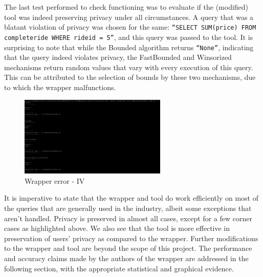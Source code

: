 \documentclass[acmsmall]{acmart}
\begin{document}
The last test performed to check functioning was to evaluate if the (modified) tool was indeed preserving privacy under all circumstances. A query that was a blatant violation of privacy was chosen for the same: \texttt{“SELECT SUM(price) FROM completeride WHERE ride\textunderscore id = 5”}, and this query was passed to the tool. It is surprising to note that while the Bounded algorithm returns \texttt{“None”}, indicating that the query indeed violates privacy, the FastBounded and Winsorized mechanisms return random values that vary with every execution of this query. This can be attributed to the selection of bounds by these two mechanisms, due to which the wrapper malfunctions.
\begin{figure}[htp]
    \centering
    \includegraphics[width=7cm]{Fig 4.3.11.png}
    \caption{Wrapper error - IV}
    \label{Fig:4.3.11}
\end{figure}

It is imperative to state that the wrapper and tool do work efficiently on most of the queries that are generally used in the industry, albeit some exceptions that aren’t handled. Privacy is preserved in almost all cases, except for a few corner cases as highlighted above. We also see that the tool is more effective in preservation of users’ privacy as compared to the wrapper. Further modifications to the wrapper and tool are beyond the scope of this project. The performance and accuracy claims made by the authors of the wrapper are addressed in the following section, with the appropriate statistical and graphical evidence.
\end{document}
